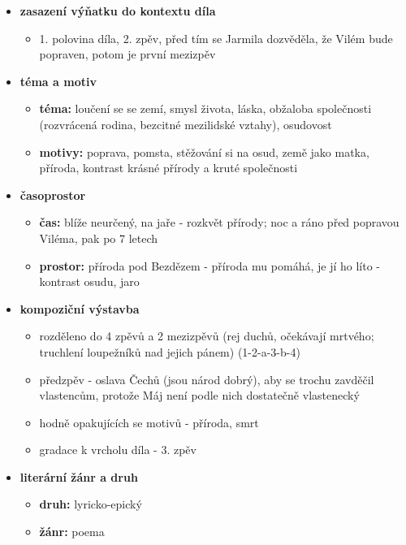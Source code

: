 \documentclass[11pt]{article}
\begin{document}
    \begin{itemize}
        \item\textbf{zasazení výňatku do kontextu díla}
        \begin{itemize}
            \item 1. polovina díla, 2. zpěv, před tím se Jarmila dozvěděla, že Vilém bude popraven, potom je první mezizpěv
        \end{itemize}
        \item\textbf{téma a motiv}
        \begin{itemize}
            \item\textbf{téma: }loučení se se zemí, smysl života, láska, obžaloba společnosti (rozvrácená rodina, bezcitné mezilidské vztahy), osudovost
            \item\textbf{motivy: }poprava, pomsta, stěžování si na osud, země jako matka, příroda, kontrast krásné přírody a kruté společnosti
        \end{itemize}
        \item\textbf{časoprostor}
        \begin{itemize}
            \item\textbf{čas: }blíže neurčený, na jaře - rozkvět přírody; noc a ráno před popravou Viléma, pak po 7 letech
            \item\textbf{prostor: }příroda pod Bezdězem - příroda mu pomáhá, je jí ho líto - kontrast osudu, jaro
        \end{itemize}
        \item\textbf{kompoziční výstavba}
        \begin{itemize}
            \item rozděleno do 4 zpěvů a 2 mezizpěvů (rej duchů, očekávají mrtvého; truchlení loupežníků nad jejich pánem) (1-2-a-3-b-4)
            \item předzpěv - oslava Čechů (jsou národ dobrý), aby se trochu zavděčil vlastencům, protože Máj není podle nich dostatečně vlastenecký
            \item hodně opakujících se motivů - příroda, smrt
            \item gradace k vrcholu díla - 3. zpěv
        \end{itemize}
        \item\textbf{literární žánr a druh}
        \begin{itemize}
            \item\textbf{druh: }lyricko-epický
            \item\textbf{žánr: }poema

\end{itemize}
\end{itemize}
\end{document}
